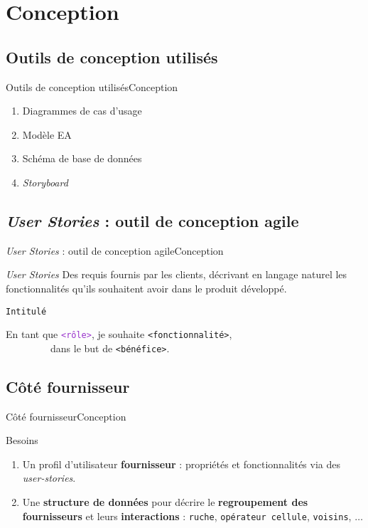 \documentclass[usenames,dvipsnames]{beamer}
\begin{document}
\section{Conception}
\subsection{Outils de conception utilisés}

\begin{frame}{Outils de conception utilisés}{Conception}
\begin{enumerate}
  \item Diagrammes de cas d'usage
  \item Modèle EA
  \item Schéma de base de données
  \item \textit{Storyboard}
\end{enumerate}
\end{frame}

\subsection{\protect\textit{User Stories} : outil de conception agile}
\begin{frame}{\textit{User Stories} : outil de conception agile}{Conception}
\begin{block}{\textit{User Stories}}
Des requis fournis par les clients, décrivant en langage naturel les fonctionnalités qu'ils souhaitent avoir dans le produit développé.
\end{block}

\begin{block}{\textcolor{Sepia}{\texttt{Intitulé}}}
\begin{it}
  En tant que \textcolor{DarkOrchid}{\texttt{<rôle>}}, je souhaite \textcolor{BrickRed}{\texttt{<fonctionnalité>}}, \\
  ~~~~~~~~~dans le but de \textcolor{OliveGreen}{\texttt{<bénéfice>}}.
\end{it}
\end{block}
\end{frame}

\subsection{Côté fournisseur}
\begin{frame}{Côté fournisseur}{Conception}
\begin{block}{Besoins}
\begin{enumerate}
  \item Un profil d'utilisateur \textbf{fournisseur} : propriétés et fonctionnalités via des \textit{user-stories}.
  \item Une \textbf{structure de données} pour décrire le \textbf{regroupement des fournisseurs} et leurs \textbf{interactions} : \texttt{ruche}, \texttt{opérateur cellule}, \texttt{voisins}, $\dots$
\end{enumerate}
\end{block}
\end{frame}
\end{document}
